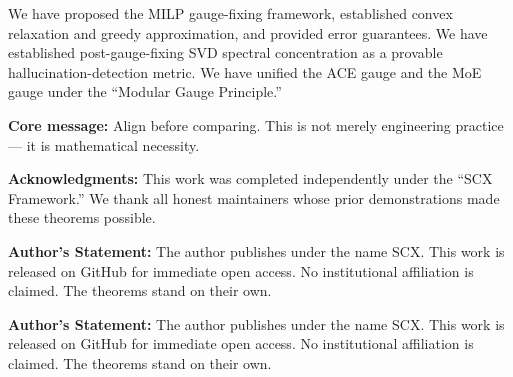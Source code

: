 \documentclass[12pt,a4paper]{article}
\theoremstyle{remark}
\begin{document}
We have proposed the MILP gauge-fixing framework, established convex relaxation and greedy approximation, and provided error guarantees. We have established post-gauge-fixing SVD spectral concentration as a provable hallucination-detection metric. We have unified the ACE gauge and the MoE gauge under the ``Modular Gauge Principle.''

\textbf{Core message:} Align before comparing. This is not merely engineering practice --- it is mathematical necessity.

\vspace{10pt}
\noindent\textbf{Acknowledgments:} This work was completed independently under the ``SCX Framework.'' We thank all honest maintainers whose prior demonstrations made these theorems possible.

\vspace{10pt}
\noindent\textbf{Author's Statement:} The author publishes under the name SCX. This work is released on GitHub for immediate open access. No institutional affiliation is claimed. The theorems stand on their own.

\vspace{10pt}
\noindent\textbf{Author's Statement:} The author publishes under the name SCX. This work is released on GitHub for immediate open access. No institutional affiliation is claimed. The theorems stand on their own.
\end{document}
